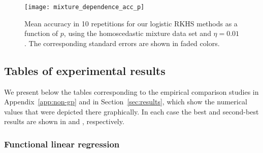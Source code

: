 \begin{figure}[ht!]
    \centering
    \texttt{[image: mixture\_dependence\_acc\_p]}
    \caption{Mean accuracy in 10 repetitions for our logistic RKHS methods as a function of \(p\), using the homoscedastic mixture data set and \(\eta=0.01\). The corresponding standard errors are shown in faded colors.}\label{fig:dependence_acc_p}
\end{figure}


\subsection{Tables of experimental results}\label{app:tables}

We present below the tables corresponding to the empirical comparison studies in Appendix~\ref{app:non-gp} and in Section~\ref{sec:results}, which show the numerical values that were depicted there graphically. In each case the best and second-best results are shown in  and , respectively.

\subsubsection*{Functional linear regression}

